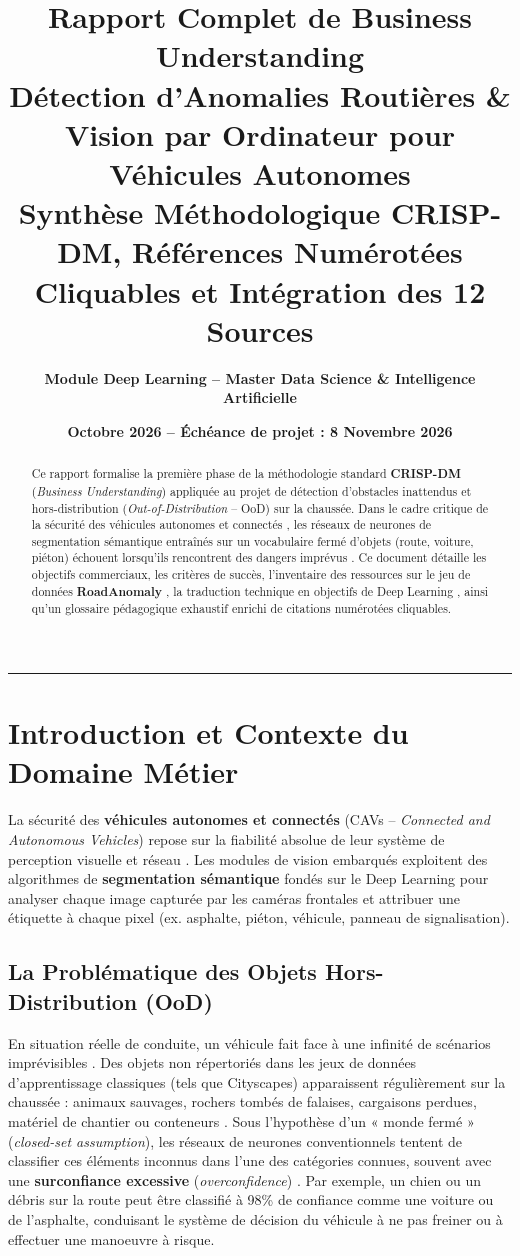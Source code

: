 \documentclass[11pt,a4paper]{article} \usepackage[utf8]{inputenc} \usepackage[T1]{fontenc}
\title{\Huge\bfseries\color{primary} Rapport Complet de Business Understanding\\[0.3em] \Large\color{secondary} Détection d'Anomalies Routières \& Vision par Ordinateur pour Véhicules Autonomes\\[0.2em] \small Synthèse Méthodologique CRISP-DM, Références Numérotées Cliquables et Intégration des 12 Sources}
\author{\textbf{Module Deep Learning -- Master Data Science \& Intelligence Artificielle}}
\date{\textbf{Octobre 2026 -- Échéance de projet : 8 Novembre 2026}}
\begin{document}
\maketitle
\begin{abstract} \noindent Ce rapport formalise la première phase de la méthodologie standard
\textbf{CRISP-DM} \cite{crispdm2026} (\emph{Business Understanding}) appliquée au projet de détection
d'obstacles inattendus et hors-distribution (\emph{Out-of-Distribution} -- OoD) sur la chaussée. Dans le
cadre critique de la sécurité des véhicules autonomes et connectés \cite{cav2023}, les réseaux de
neurones de segmentation sémantique entraînés sur un vocabulaire fermé d'objets (route, voiture, piéton)
échouent lorsqu'ils rencontrent des dangers imprévus \cite{lis2019detecting, chan2021segmentmeifyoucan}.
Ce document détaille les objectifs commerciaux, les critères de succès, l'inventaire des ressources sur
le jeu de données \textbf{RoadAnomaly} \cite{lis2019detecting, assignment2026}, la traduction technique
en objectifs de Deep Learning \cite{zhao2024survey, s2m2024, pixood2024, zhou2024propetl,
perspective2024, toyota2024, muller2024}, ainsi qu'un glossaire pédagogique exhaustif enrichi de
citations numérotées cliquables.
\end{abstract} \vspace{0.5em} \hrule \vspace{1em} \tableofcontents \newpage
\section{Introduction et Contexte du Domaine Métier}
La sécurité des \textbf{véhicules autonomes et connectés} (CAVs -- \emph{Connected and Autonomous
Vehicles}) repose sur la fiabilité absolue de leur système de perception visuelle et réseau
\cite{cav2023}. Les modules de vision embarqués exploitent des algorithmes de \textbf{segmentation
sémantique} fondés sur le Deep Learning pour analyser chaque image capturée par les caméras frontales et
attribuer une étiquette à chaque pixel (ex. asphalte, piéton, véhicule, panneau de signalisation).
\subsection{La Problématique des Objets Hors-Distribution (OoD)}
En situation réelle de conduite, un véhicule fait face à une infinité de scénarios imprévisibles \cite{zhao2024survey}. Des objets non répertoriés dans les jeux de données d'apprentissage classiques (tels que Cityscapes) apparaissent régulièrement sur la chaussée : animaux sauvages, rochers tombés de falaises, cargaisons perdues, matériel de chantier ou conteneurs \cite{lis2019detecting, chan2021segmentmeifyoucan}. Sous l'hypothèse d'un « monde fermé » (\emph{closed-set assumption}), les réseaux de neurones conventionnels tentent de classifier ces éléments inconnus dans l'une des catégories connues, souvent avec une \textbf{surconfiance excessive} (\emph{overconfidence}) \cite{chan2021segmentmeifyoucan}. Par exemple, un chien ou un débris sur la route peut être classifié à 98\% de confiance comme une voiture ou de l'asphalte, conduisant le système de décision du véhicule à ne pas freiner ou à effectuer une manoeuvre à risque.
\end{document}
